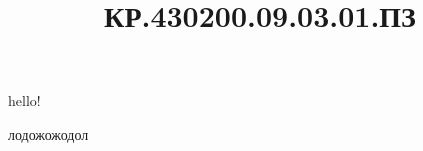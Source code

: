 \documentclass{kurreport}
\title{КР.430200.09.03.01.ПЗ}
\begin{document}

\BGfrom{\thepage}
\setcounter{page}{2}

\lipsum[1-5]
\newpage
hello!

лодожожодол

\lipsum[1-1500]
\end{document}
